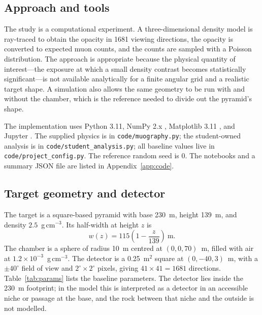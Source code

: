 \documentclass{article}
\begin{document}
\subsection{Approach and tools}

The study is a computational experiment. A three-dimensional density model is
ray-traced to obtain the opacity in 1681 viewing directions, the opacity is
converted to expected muon counts, and the counts are sampled with a Poisson
distribution. The approach is appropriate because the physical quantity of
interest---the exposure at which a small density contrast becomes statistically
significant---is not available analytically for a finite angular grid and a
realistic target shape. A simulation also allows the same geometry to be run
with and without the chamber, which is the reference needed to divide out the
pyramid's shape.

\begin{sloppypar}
The implementation uses Python 3.11, NumPy 2.x \cite{harris2020numpy},
Matplotlib 3.11 \cite{hunter2007matplotlib}, and Jupyter
\cite{kluyver2016jupyter}. The supplied physics is in
\texttt{code/muography.py}; the student-owned analysis is in
\texttt{code/student\_analysis.py}; all baseline values live in
\texttt{code/project\_config.py}. The reference random seed is 0. The notebooks
and a summary JSON file are listed in Appendix~\ref{app:code}.
\end{sloppypar}

\subsection{Target geometry and detector}

The target is a square-based pyramid with base 230~m, height 139~m, and
density $2.5$~g\,cm$^{-3}$. Its half-width at height $z$ is
\begin{equation}
w(z)=115\left(1-\frac{z}{139}\right)~\mathrm{m}.
\label{eq:width}
\end{equation}
The chamber is a sphere of radius 10~m centred at $(0,0,70)$~m, filled with air
at $1.2\times10^{-3}$~g\,cm$^{-3}$. The detector is a 0.25~m$^2$ square at
$(0,-40,3)$~m, with a $\pm40^\circ$ field of view and $2^\circ\times2^\circ$
pixels, giving $41\times41=1681$ directions. Table~\ref{tab:params} lists the
baseline parameters. The detector lies inside the 230~m footprint; in the model
this is interpreted as a detector in an accessible niche or passage at the base,
and the rock between that niche and the outside is not modelled.
\end{document}
